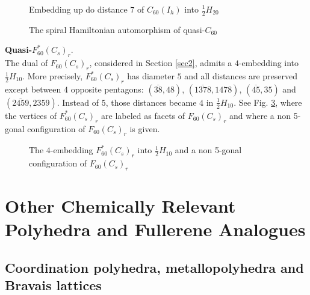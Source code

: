 \begin{figure}[htb]
\begin{center}
\caption{Embedding up do distance $7$ of $C_{60}(I_h)$ into 
$\frac{1}{2}H_{20}$}\label{7embeddingofC60} 
\end{center}
\end{figure}

\begin{figure}[htb]
\begin{center}
\caption{The spiral Hamiltonian automorphism of quasi-$C_{60}$}\label{spiral}
\end{center}
\end{figure}

\newpage
\noindent
{\bf Quasi-$F^*_{60}(C_s)_r$}.\\
The dual of $F_{60}(C_s)_r$, considered in Section \ref{sec2},
admits a $4$-embedding into $\frac{1}{2}H_{10}$.
More precisely, $F^*_{60}(C_s)_r$ has diameter $5$ and all distances are preserved
except between $4$ opposite pentagons:
$(\overline{38},48)$,
$(\overline{1378},1478)$,
$(\overline{45},35)$
and
$(\overline{2459},2359)$.
Instead of $5$, those distances became $4$ in $\frac{1}{2}H_{10}$. See Fig. \ref{4embeddingofF60},
where the vertices of
$F^*_{60}(C_s)_r$ are labeled as facets of $F_{60}(C_s)_r$
and where a non 5-gonal configuration of $F_{60}(C_s)_r$ is given.
\begin{figure}[htb]
\begin{center}
\caption{The $4$-embedding $F^*_{60}(C_s)_r$ into $\frac{1}{2}H_{10}$
and a non 5-gonal configuration of $F_{60}(C_s)_r$}\label{4embeddingofF60}
\end{center}
\end{figure}

\newpage
\section{Other Chemically Relevant Polyhedra and Fullerene Analogues}
\subsection{Coordination polyhedra, metallopolyhedra and Bravais lattices}
